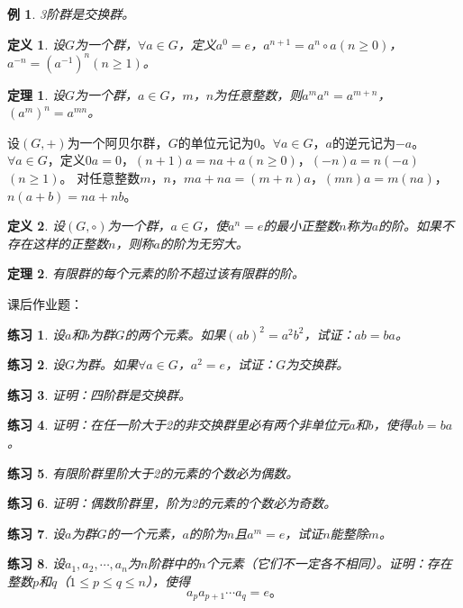 \documentclass{article}
\newtheorem{Def}{定义}
\newtheorem{Thm}{定理}
\newtheorem{Exercise}{练习}
\newtheorem*{Example}{例}
\begin{document}
\begin{CJK*}{UTF8}{gbsn}
\begin{Example}
  3阶群是交换群。
\end{Example}
\begin{Def}
  设$G$为一个群，$\forall a\in G$，定义$a^0=e$，$a^{n+1}=a^n\circ a$$(n\geq 0)$，$a^{-n}=(a^{-1})^n$$(n\geq 1)$。
\end{Def}
\begin{Thm}
设$G$为一个群，$a\in G$，$m$，$n$为任意整数，则$a^ma^n=a^{m+n}$，$(a^m)^n=a^{mn}$。
\end{Thm}
设$(G,+)$为一个阿贝尔群，$G$的单位元记为$0$。$\forall a\in G$，$a$的逆元记为$-a$。$\forall a\in G$，定义$0a=0$，$(n+1)a=na+a$$(n\geq 0)$，$(-n)a=n(-a)$$(n\geq 1)$。
对任意整数$m$，$n$，$ma+na=(m+n)a$，$(mn)a=m(na)$，$n(a+b)=na+nb$。
\begin{Def}
  设$(G,\circ)$为一个群，$a\in G$，使$a^n=e$的最小正整数$n$称为$a$的阶。如果不存在这样的正整数$n$，则称$a$的阶为无穷大。
\end{Def}
\begin{Thm}
  有限群的每个元素的阶不超过该有限群的阶。
\end{Thm}
课后作业题：

\begin{Exercise}
  设$a$和$b$为群$G$的两个元素。如果$(ab)^2=a^2b^2$，试证：$ab=ba$。
\end{Exercise}
\begin{Exercise}
  设$G$为群。如果$\forall a\in G$，$a^2=e$，试证：$G$为交换群。
\end{Exercise}
\begin{Exercise}
  证明：四阶群是交换群。
\end{Exercise}
\begin{Exercise}
  证明：在任一阶大于2的非交换群里必有两个非单位元$a$和$b$，使得$ab=ba$。
\end{Exercise}
\begin{Exercise}
  有限阶群里阶大于2的元素的个数必为偶数。
\end{Exercise}
\begin{Exercise}
  证明：偶数阶群里，阶为2的元素的个数必为奇数。
\end{Exercise}
\begin{Exercise}
  设$a$为群$G$的一个元素，$a$的阶为$n$且$a^m=e$，试证$n$能整除$m$。
\end{Exercise}
\begin{Exercise}
  设$a_1,a_2,\cdots,a_n$为$n$阶群中的$n$个元素（它们不一定各不相同）。证明：存在整数$p$和$q$（$1\leq p \leq q \leq n$），使得
  \[a_pa_{p+1}\cdots a_q=e\text{。}\]
\end{Exercise}
\end{CJK*}
\end{document}
